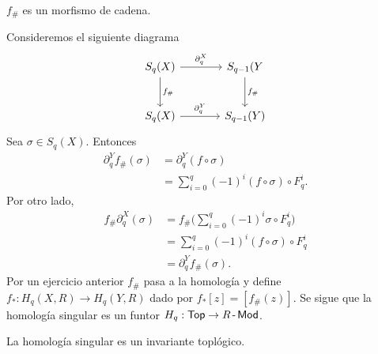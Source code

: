 \begin{lema}
    $f_\#$ es un morfismo de cadena.
\end{lema} 
\begin{dem}
    Consideremos el siguiente diagrama
    \begin{equation*}
        \begin{tikzcd}[row sep=large, column sep=large]
            S_q(X)\arrow[r,"\partial_q^X"]\arrow[d,"f_\#"] & S_{q-1}(Y\arrow[d,"f_\#"]\\
            S_q(X)\arrow[r,"\partial_q^Y"] & S_{q-1}(Y)
        \end{tikzcd}
    \end{equation*}
    Sea $\sigma\in S_q(X)$. Entonces
    \begin{align*}
        \partial_q^Yf_\#(\sigma)&= \partial_q^Y(f\circ\sigma)\\
        &=\sum_{i=0}^q(-1)^i(f\circ \sigma)\circ F_q^i.
    \end{align*}
    Por otro lado, 
    \begin{align*}
        f_{\#}\partial_q^X(\sigma)&=f_\#\Big(\sum_{i=0}^q(-1)^i\sigma\circ F^i_q\Big)\\
        &=\sum_{i=0}^q(-1)^i(f\circ \sigma)\circ F_q^i\\
        &=\partial_q^Yf_\#(\sigma).
    \end{align*}
    Por un ejercicio anterior %
    $f_\#$ pasa a la homología y define $f_*:H_q(X,R)\to H_q(Y,R)$ dado por $f_*[z]=[f_\#(z)]$. Se sigue que la homología singular es un funtor $H_q:\Top\to \Mod$.
\end{dem}
\begin{coro}
    La homología singular es un invariante toplógico.
\end{coro}

